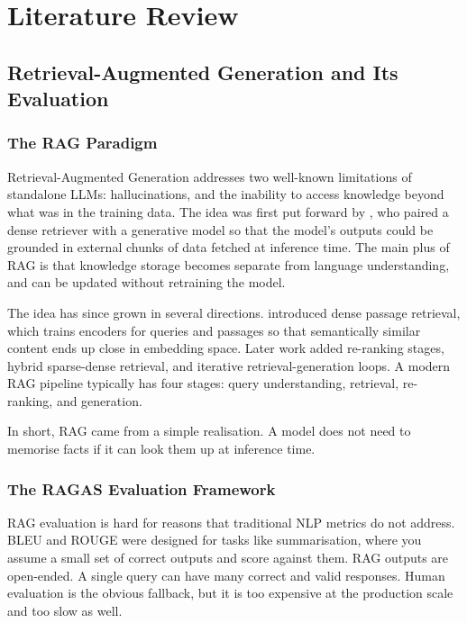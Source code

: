 
\chapter{Literature Review}

\section{Retrieval-Augmented Generation and Its Evaluation}

\subsection{The RAG Paradigm}

Retrieval-Augmented Generation addresses two well-known limitations of standalone LLMs: hallucinations, and the inability to access knowledge beyond what was in the training data. The idea was first put forward by \citet{lewis2020retrieval}, who paired a dense retriever with a generative model so that the model's outputs could be grounded in external chunks of data fetched at inference time. The main plus of RAG is that knowledge storage becomes separate from language understanding, and can be updated without retraining the model.

The idea has since grown in several directions. \citet{karpukhin2020dense} introduced dense passage retrieval, which trains encoders for queries and passages so that semantically similar content ends up close in embedding space. Later work added re-ranking stages, hybrid sparse-dense retrieval, and iterative retrieval-generation loops. A modern RAG pipeline typically has four stages: query understanding, retrieval, re-ranking, and generation.

In short, RAG came from a simple realisation. A model does not need to memorise facts if it can look them up at inference time.

\subsection{The RAGAS Evaluation Framework}

RAG evaluation is hard for reasons that traditional NLP metrics do not address. BLEU and ROUGE were designed for tasks like summarisation, where you assume a small set of correct outputs and score against them. RAG outputs are open-ended. A single query can have many correct and valid responses. Human evaluation is the obvious fallback, but it is too expensive at the production scale and too slow as well.

